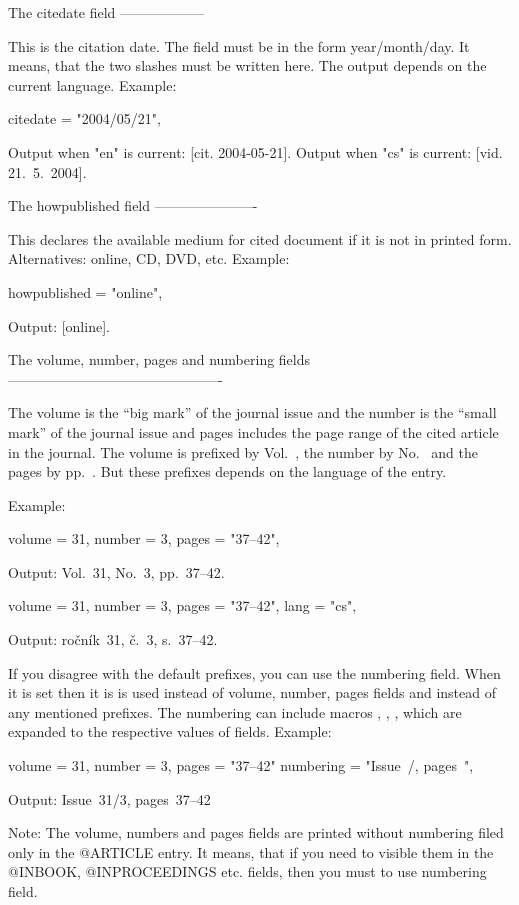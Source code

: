 The citedate field
------------------

This is the citation date. The field must be in the form year/month/day. It
means, that the two slashes must be written here. The output depends on the
current language. Example:

    citedate = "2004/05/21",

Output when "en" is current:    [cit. 2004-05-21].
Output when "cs" is current:    [vid. 21.~5.~2004].


The howpublished field
----------------------

This declares the available medium for cited document if it is not in printed
form. Alternatives: online, CD, DVD, etc. Example:

    howpublished = "online",

Output:   [online].
 

The volume, number, pages and numbering fields
----------------------------------------------

The volume is the ``big mark'' of the journal issue and the number is the
``small mark'' of the journal issue and pages includes the page range of 
the cited article in the journal. The volume is prefixed by Vol.~,
the number by No.~ and the pages by pp.~. But these prefixes depends on the
language of the entry.

Example:

    volume = 31,
    number = 3,
    pages  = "37--42",

Output:   Vol.~31, No.~3, pp.~37--42.

    volume = 31,
    number = 3, 
    pages  = "37--42",
    lang   = "cs",

Output:   ročník~31, č.~3, s.~37--42.

If you disagree with the default prefixes, you can use the numbering field.
When it is set then it is is used instead of volume, number, pages fields 
and instead of any mentioned prefixes. The numbering can include macros  \VOL, 
\NO, \PP, which are expanded to the respective values of fields. Example:

    volume    = 31,
    number    = 3,
    pages     = "37--42"
    numbering = "Issue~\VOL/\NO, pages~\PP",

Output:   Issue~31/3, pages~37--42

Note: The volume, numbers and pages fields are printed without numbering
filed only in the @ARTICLE entry. It means, that if you need to visible them
in the @INBOOK, @INPROCEEDINGS etc. fields, then you must to use numbering field.


